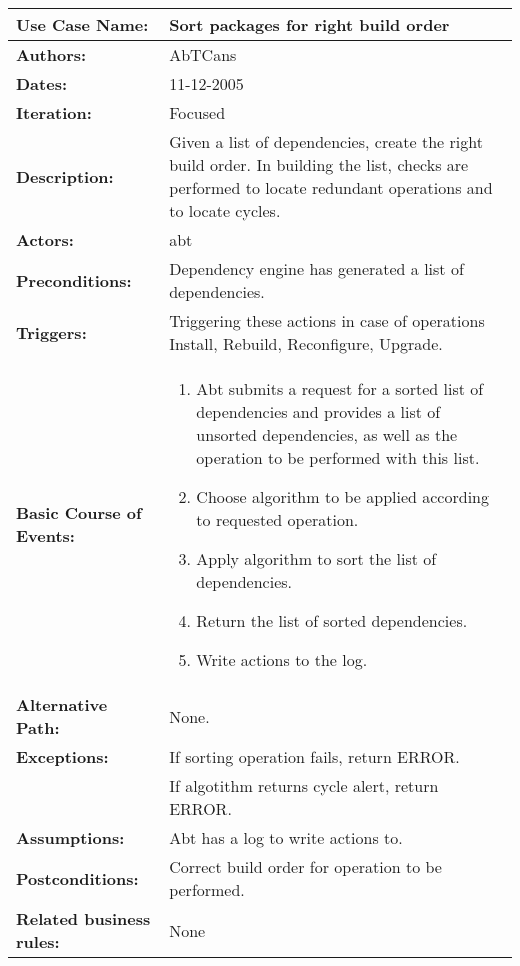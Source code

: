 \begin{tabularx}{\linewidth}{|l|X|}
\hline
\textbf{Use Case Name:} & \textbf{Sort packages for right build order} \\
\hline
\textbf{Authors:} & AbTCans\\
\hline
\textbf{Dates:} & 11-12-2005\\
\hline
\textbf{Iteration:} & Focused\\
\hline
\textbf{Description:} & Given a list of dependencies, create the right build order. In building the list, checks are performed to locate redundant operations and to locate cycles.\\
\hline
\textbf{Actors:} & abt \\ 
\hline
\textbf{Preconditions:} & Dependency engine has generated a list of dependencies.\\ 
\hline
\textbf{Triggers:} & Triggering these actions in case of operations Install, Rebuild, Reconfigure, Upgrade.\\
\hline
\textbf{Basic Course of Events:} & 
\begin{minipage}{\linewidth} 
  \vspace{0.05em}
  \begin{enumerate}
  \item Abt submits a request for a sorted list of dependencies and provides a list of unsorted dependencies, as well as the operation to be performed with this list.
  \item Choose algorithm to be applied according to requested operation.
  \item Apply algorithm to sort the list of dependencies.
  \item Return the list of sorted dependencies.
  \item Write actions to the log.
   \vspace{0.05em}
  \end{enumerate}
\end{minipage}
\\
\hline 
\textbf{Alternative Path:} & None.\\
\hline
\textbf{Exceptions:} & If sorting operation fails, return ERROR. \\
 & If algotithm returns cycle alert, return ERROR.\\
\hline
\textbf{Assumptions:} & Abt has a log to write actions to.\\
\hline
\textbf{Postconditions:} & Correct build order for operation to be performed.\\
\hline
\textbf{Related business rules:} & None\\
\hline
\end{tabularx}


      
